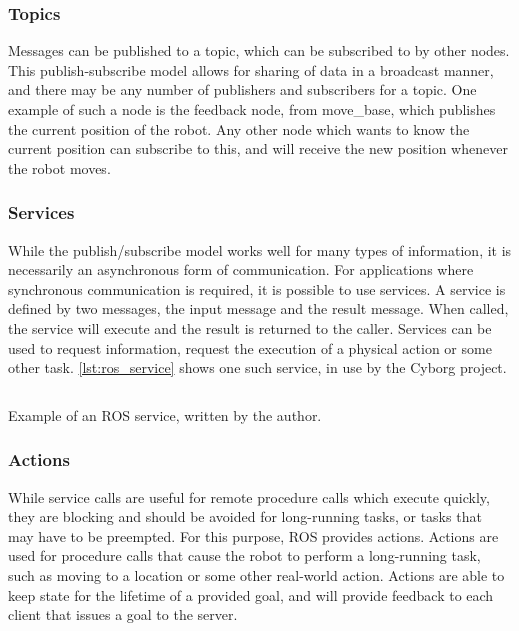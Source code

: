 \documentclass[\rootfolder/main.tex]{subfiles}
\begin{document}
\subsubsection{Topics}

Messages can be published to a topic, which can be subscribed to by other nodes.
This publish-subscribe model allows for sharing of data in a broadcast manner, and there may be any number of publishers and subscribers for a topic.
One example of such a node is the feedback node, from move\_base, which publishes the current position of the robot.
Any other node which wants to know the current position can subscribe to this, and will receive the new position whenever the robot moves.

\subsubsection{Services}

While the publish/subscribe model works well for many types of information, it is necessarily an asynchronous form of communication.
For applications where synchronous communication is required, it is possible to use services.
A service is defined by two messages, the input message and the result message.
When called, the service will execute and the result is returned to the caller.
Services can be used to request information, request the execution of a physical action or some other task.
\cref{lst:ros_service} shows one such service, in use by the Cyborg project.

\begin{listing}
    \inputminted{python}{\rootfolder/Chapters/Chapter2/Listings/distance_to_goal.py}
    \caption{Example of an ROS service, written by the author.}
    \label{lst:ros_service}
\end{listing}


\subsubsection{Actions}

While service calls are useful for remote procedure calls which execute quickly, they are blocking and should be avoided for long-running tasks, or tasks that may have to be preempted.
For this purpose, ROS provides actions.
Actions are used for procedure calls that cause the robot to perform a long-running task, such as moving to a location or some other real-world action.
Actions are able to keep state for the lifetime of a provided goal, and will provide feedback to each client that issues a goal to the server.
\end{document}
